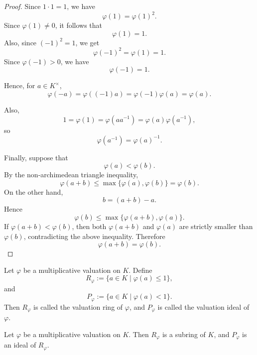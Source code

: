 \begin{proof}
    Since \(1\cdot 1=1\), we have
    \[
        \varphi(1)=\varphi(1)^2.
    \]
    Since \(\varphi(1)\neq 0\), it follows that
    \[
        \varphi(1)=1.
    \]
    Also, since \((-1)^2=1\), we get
    \[
        \varphi(-1)^2=\varphi(1)=1.
    \]
    Since \(\varphi(-1)>0\), we have
    \[
        \varphi(-1)=1.
    \]

    Hence, for \(a\in K^\times\),
    \[
        \varphi(-a)=\varphi((-1)a)=\varphi(-1)\varphi(a)=\varphi(a).
    \]

    Also,
    \[
        1=\varphi(1)=\varphi(aa^{-1})=\varphi(a)\varphi(a^{-1}),
    \]
    so
    \[
        \varphi(a^{-1})=\varphi(a)^{-1}.
    \]

    Finally, suppose that
    \[
        \varphi(a)<\varphi(b).
    \]
    By the non-archimedean triangle inequality,
    \[
        \varphi(a+b)\leq \max\{\varphi(a),\varphi(b)\}=\varphi(b).
    \]
    On the other hand,
    \[
        b=(a+b)-a.
    \]
    Hence
    \[
        \varphi(b)
        \leq
        \max\{\varphi(a+b),\varphi(a)\}.
    \]
    If \(\varphi(a+b)<\varphi(b)\), then both \(\varphi(a+b)\) and \(\varphi(a)\) are
    strictly smaller than \(\varphi(b)\), contradicting the above inequality. Therefore
    \[
        \varphi(a+b)=\varphi(b).
    \]
\end{proof}

\begin{definition}
    Let \(\varphi\) be a multiplicative valuation on \(K\). Define
    \[
        R_\varphi
        :=
        \{a\in K\mid \varphi(a)\leq 1\},
    \]
    and
    \[
        P_\varphi
        :=
        \{a\in K\mid \varphi(a)<1\}.
    \]
    Then \(R_\varphi\) is called the valuation ring of \(\varphi\), and
    \(P_\varphi\) is called the valuation ideal of \(\varphi\).
\end{definition}

\begin{proposition}
    Let \(\varphi\) be a multiplicative valuation on \(K\). Then \(R_\varphi\) is a
    subring of \(K\), and \(P_\varphi\) is an ideal of \(R_\varphi\).
\end{proposition}

